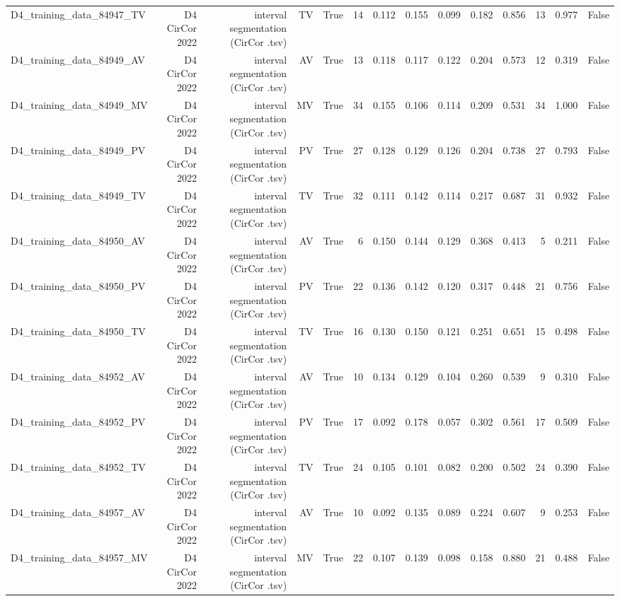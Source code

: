 \begin{table}[htbp]
\begin{tabular}{lrrrrrrrrrrrrr}
    D4\_training\_data\_84947\_TV & D4 CirCor 2022 & interval segmentation (CirCor .tsv) & TV & True & 14 & 0.112 & 0.155 & 0.099 & 0.182 & 0.856 & 13 & 0.977 & False \\
    D4\_training\_data\_84949\_AV & D4 CirCor 2022 & interval segmentation (CirCor .tsv) & AV & True & 13 & 0.118 & 0.117 & 0.122 & 0.204 & 0.573 & 12 & 0.319 & False \\
    D4\_training\_data\_84949\_MV & D4 CirCor 2022 & interval segmentation (CirCor .tsv) & MV & True & 34 & 0.155 & 0.106 & 0.114 & 0.209 & 0.531 & 34 & 1.000 & False \\
    D4\_training\_data\_84949\_PV & D4 CirCor 2022 & interval segmentation (CirCor .tsv) & PV & True & 27 & 0.128 & 0.129 & 0.126 & 0.204 & 0.738 & 27 & 0.793 & False \\
    D4\_training\_data\_84949\_TV & D4 CirCor 2022 & interval segmentation (CirCor .tsv) & TV & True & 32 & 0.111 & 0.142 & 0.114 & 0.217 & 0.687 & 31 & 0.932 & False \\
    D4\_training\_data\_84950\_AV & D4 CirCor 2022 & interval segmentation (CirCor .tsv) & AV & True & 6 & 0.150 & 0.144 & 0.129 & 0.368 & 0.413 & 5 & 0.211 & False \\
    D4\_training\_data\_84950\_PV & D4 CirCor 2022 & interval segmentation (CirCor .tsv) & PV & True & 22 & 0.136 & 0.142 & 0.120 & 0.317 & 0.448 & 21 & 0.756 & False \\
    D4\_training\_data\_84950\_TV & D4 CirCor 2022 & interval segmentation (CirCor .tsv) & TV & True & 16 & 0.130 & 0.150 & 0.121 & 0.251 & 0.651 & 15 & 0.498 & False \\
    D4\_training\_data\_84952\_AV & D4 CirCor 2022 & interval segmentation (CirCor .tsv) & AV & True & 10 & 0.134 & 0.129 & 0.104 & 0.260 & 0.539 & 9 & 0.310 & False \\
    D4\_training\_data\_84952\_PV & D4 CirCor 2022 & interval segmentation (CirCor .tsv) & PV & True & 17 & 0.092 & 0.178 & 0.057 & 0.302 & 0.561 & 17 & 0.509 & False \\
    D4\_training\_data\_84952\_TV & D4 CirCor 2022 & interval segmentation (CirCor .tsv) & TV & True & 24 & 0.105 & 0.101 & 0.082 & 0.200 & 0.502 & 24 & 0.390 & False \\
    D4\_training\_data\_84957\_AV & D4 CirCor 2022 & interval segmentation (CirCor .tsv) & AV & True & 10 & 0.092 & 0.135 & 0.089 & 0.224 & 0.607 & 9 & 0.253 & False \\
    D4\_training\_data\_84957\_MV & D4 CirCor 2022 & interval segmentation (CirCor .tsv) & MV & True & 22 & 0.107 & 0.139 & 0.098 & 0.158 & 0.880 & 21 & 0.488 & False \\

\end{tabular}
\end{table}
